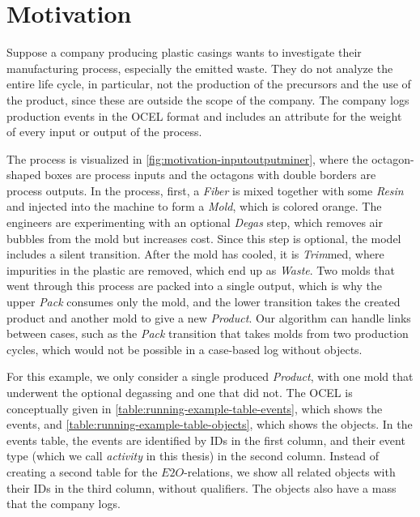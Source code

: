 \section{Motivation}
\label{sec:intro_ssec:motiv}



Suppose a company producing plastic casings wants to investigate their manufacturing process, especially the emitted waste.
They do not analyze the entire life cycle, in particular, not the production of the precursors and the use of the product, since these are outside the scope of the company.
The company logs production events in the OCEL format and includes an attribute for the weight of every input or output of the process.



The process is visualized in \autoref{fig:motivation-inputoutputminer}, where the octagon-shaped boxes are process inputs and the octagons with double borders are process outputs.
In the process, first, a \emph{Fiber} is mixed together with some \emph{Resin} and injected into the machine to form a \emph{Mold}, which is colored orange.
The engineers are experimenting with an optional \emph{Degas} step, which removes air bubbles from the mold but increases cost.
Since this step is optional, the model includes a silent transition.
After the mold has cooled, it is \emph{Trim}med, where impurities in the plastic are removed, which end up as \emph{Waste}.
Two molds that went through this process are packed into a single output, which is why the upper \emph{Pack} consumes only the mold, and the lower transition takes the created product and another mold to give a new \emph{Product}.
Our algorithm can handle links between cases, such as the \emph{Pack} transition that takes molds from two production cycles, which would not be possible in a case-based log without objects.


For this example, we only consider a single produced \emph{Product}, with one mold that underwent the optional degassing and one that did not.
The OCEL is conceptually given in \autoref{table:running-example-table-events}, which shows the events, and \autoref{table:running-example-table-objects}, which shows the objects.
In the events table, the events are identified by IDs in the first column, and their event type (which we call \emph{activity} in this thesis) in the second column.
Instead of creating a second table for the $E2O$-relations, we show all related objects with their IDs in the third column, without qualifiers.
The objects also have a mass that the company logs.

